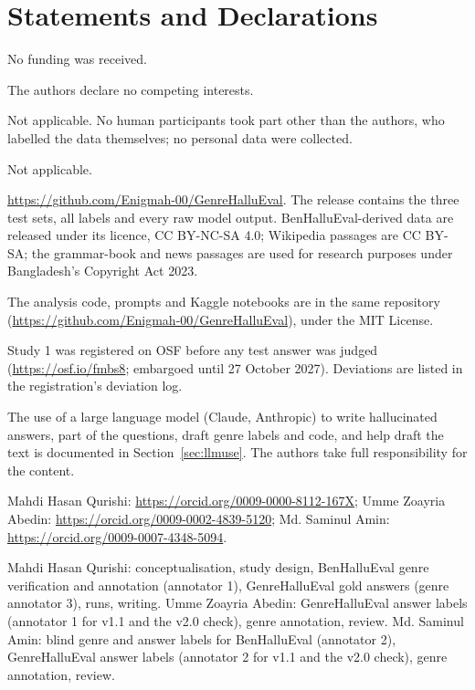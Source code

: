 \documentclass[pdflatex,sn-apa]{sn-jnl}
\begin{document}
\backmatter


\section*{Statements and Declarations}

No funding was received.

The authors declare no competing interests.

Not applicable. No human participants took part other than
the authors, who labelled the data themselves; no personal data were collected.

Not applicable.

\url{https://github.com/Enigmah-00/GenreHalluEval}. The release contains the
three test sets, all labels and every raw model output. BenHalluEval-derived data are
released under its licence, CC BY-NC-SA 4.0; Wikipedia passages are CC BY-SA; the grammar-book and news passages
are used for research purposes under Bangladesh's Copyright Act 2023.

The analysis code, prompts and Kaggle notebooks are in the same repository
(\url{https://github.com/Enigmah-00/GenreHalluEval}), under the MIT License.

Study 1 was registered on OSF before any test answer was judged
(\url{https://osf.io/fmbs8}; embargoed until 27 October 2027). Deviations are listed in the
registration's deviation log.

The use of a large language model (Claude, Anthropic) to write hallucinated
answers, part of the questions, draft genre labels and code, and help draft the text is documented in
Section~\ref{sec:llmuse}. The authors take full responsibility for the content.

Mahdi Hasan Qurishi: \url{https://orcid.org/0009-0000-8112-167X};
Umme Zoayria Abedin: \url{https://orcid.org/0009-0002-4839-5120};
Md. Saminul Amin: \url{https://orcid.org/0009-0007-4348-5094}.

Mahdi Hasan Qurishi: conceptualisation, study
design, BenHalluEval genre verification and annotation (annotator 1), GenreHalluEval gold answers (genre annotator 3),
runs, writing. Umme Zoayria Abedin: GenreHalluEval answer labels (annotator 1 for v1.1 and the v2.0 check),
genre annotation, review. Md. Saminul Amin: blind genre and answer labels for BenHalluEval (annotator 2), GenreHalluEval
answer labels (annotator 2 for v1.1 and the v2.0 check), genre annotation, review.
\end{document}
